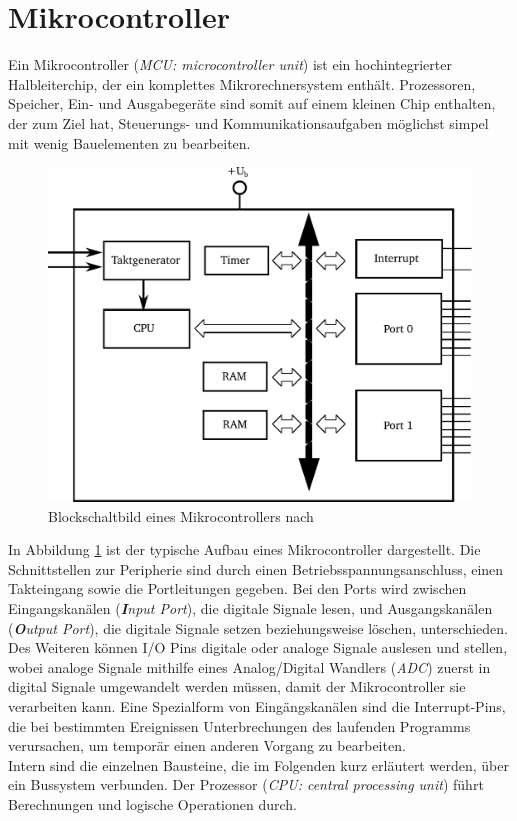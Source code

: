 \section{Mikrocontroller}
Ein Mikrocontroller (\textit{MCU: microcontroller unit}) ist ein hochintegrierter Halbleiterchip, der ein komplettes Mikrorechnersystem enthält. Prozessoren, Speicher, Ein- und Ausgabegeräte sind somit auf einem kleinen Chip enthalten, der zum Ziel hat, Steuerungs- und Kommunikationsaufgaben möglichst simpel mit wenig Bauelementen zu bearbeiten. \\
\begin{figure}[h]
	\centering
		\includegraphics[width=0.55\columnwidth]{Bilder/BlockschaltbildMikrocontroller2.pdf}
	\caption{Blockschaltbild eines Mikrocontrollers nach \cite[S.3]{Bernstein2015}}
	\label{fig:Blockschaltbild Mikrocontroller}
\end{figure} 
\noindent
In Abbildung \ref{fig:Blockschaltbild Mikrocontroller} ist der typische Aufbau eines Mikrocontroller dargestellt. Die Schnittstellen zur Peripherie sind durch einen Betriebsspannungsanschluss, einen Takteingang sowie die Portleitungen  gegeben. Bei den Ports wird zwischen Eingangskanälen (\textit{\textbf{I}nput Port}), die digitale Signale lesen, und Ausgangskanälen (\textit{\textbf{O}utput Port}), die digitale Signale setzen beziehungsweise löschen, unterschieden. Des Weiteren können I/O Pins digitale oder analoge Signale auslesen und stellen, wobei analoge Signale mithilfe eines Analog/Digital Wandlers (\textit{ADC}) zuerst in digital Signale umgewandelt werden müssen, damit der Mikrocontroller sie verarbeiten kann.
Eine Spezialform von Eingängskanälen sind die Interrupt-Pins, die bei bestimmten Ereignissen Unterbrechungen des laufenden Programms verursachen, um temporär einen anderen Vorgang zu bearbeiten. \\
Intern sind die einzelnen Bausteine, die im Folgenden kurz erläutert werden, über ein Bussystem verbunden.
Der Prozessor (\textit{CPU: central processing unit}) führt Berechnungen und logische Operationen durch.
